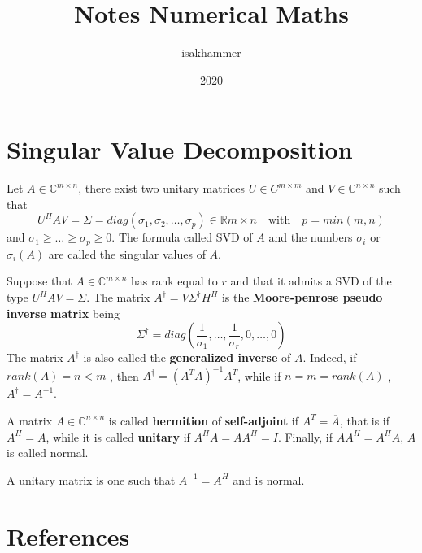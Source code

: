 \documentclass{article}
\title{Notes Numerical Maths}
\author{isakhammer }
\date{2020}
\theoremstyle{remark}
\begin{document}
\maketitle
\tableofcontents
\newpage
  
\newpage
\section{Singular Value Decomposition}%
\label{sec:singular_value_decomposition}

\begin{definition}
  Let $A \in  \mathbb{C} ^{m \times n }$, there exist two unitary matrices $U \in  C ^{m \times m }$ and $V \in \mathbb{C} ^{n \times n }$ such that \[
    U^{H} A V = \Sigma  = diag\left( \sigma _{1},\sigma _{2}, \ldots , \sigma _{p} \right) \in \mathbb{R} m \times n  \quad \text{with} \quad p = min\left( m,n \right)  
  \] 
  and $\sigma _{1}\ge \ldots \ge \sigma _{p} \ge 0$. The formula called SVD of $A$ and the numbers $\sigma _{i}$ or $\sigma_{i} \left( A \right)$ are called the singular values of $A$.
\end{definition}

\begin{definition}
  Suppose that $A \in  \mathbb{C} ^{m \times n } $ has rank equal to $r$ and that it admits a SVD of the type $U^{H} A V = \Sigma $.  The matrix $A^{\dagger} = V \Sigma ^{\dagger} H ^{H}$ is the \textbf{Moore-penrose pseudo inverse matrix }  being \[
  \Sigma ^{\dagger} = diag\left( \frac{1}{\sigma _{1}} ,\ldots, \frac{1}{\sigma _{r}}, 0, \ldots, 0 \right)
  \] 
  The matrix $A^{\dagger}$ is also called the \textbf{generalized inverse}  of $A$. Indeed, if $rank\left( A \right) = n < m$ , then $A^{\dagger} = \left( A^{T} A \right)^{-1} A^{T} $, while if $n =m = rank\left( A \right)$ , $A^{\dagger} = A^{-1}$. 
\end{definition}

\begin{definition}
  A matrix $A \in \mathbb{C} ^{n \times n }$ is called \textbf{hermition} of \textbf{self-adjoint}  if $A^{T} = \overline{A}$, that is if $A^{H} = A$, while it is called \textbf{unitary}  if $A^{H}A = A A^{H} = I$. Finally, if $A A^{H} = A^{H}A$, $A$ is called normal. 
\end{definition}
A unitary matrix is one such that $A^{-1}= A^{H}$ and is normal.


\newpage
\section{References}%
\label{sec:references}



\end{document}
